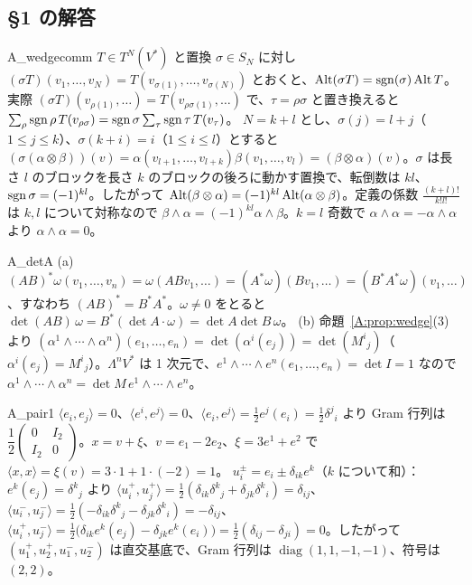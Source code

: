 
\subsection*{§1 の解答}


\begin{soll}{A_wedgecomm}
$T\in T^N(V^*)$ と置換 $\sigma\in S_N$ に対し $(\sigma T)(v_1,\dots,v_N)=T(v_{\sigma(1)},\dots,v_{\sigma(N)})$ とおくと、$\operatorname{Alt}(\sigma T)=\operatorname{sgn}(\sigma)\operatorname{Alt} T$。実際 $(\sigma T)(v_{\rho(1)},\dots)=T(v_{\rho\sigma(1)},\dots)$ で、$\tau=\rho\sigma$ と置き換えると $\sum_\rho\operatorname{sgn}\rho\,T(v_{\rho\sigma})=\operatorname{sgn}\sigma\sum_\tau\operatorname{sgn}\tau\,T(v_\tau)$。
$N=k+l$ とし、$\sigma(j)=l+j$（$1\le j\le k$）、$\sigma(k+i)=i$（$1\le i\le l$）とすると $(\sigma(\alpha\otimes\beta))(v)=\alpha(v_{l+1},\dots,v_{l+k})\beta(v_1,\dots,v_l)=(\beta\otimes\alpha)(v)$。$\sigma$ は長さ $l$ のブロックを長さ $k$ のブロックの後ろに動かす置換で、転倒数は $kl$、$\operatorname{sgn}\sigma=(-1)^{kl}$。したがって $\operatorname{Alt}(\beta\otimes\alpha)=(-1)^{kl}\operatorname{Alt}(\alpha\otimes\beta)$。定義の係数 $\frac{(k+l)!}{k!l!}$ は $k,l$ について対称なので $\beta\wedge\alpha=(-1)^{kl}\alpha\wedge\beta$。$k=l$ 奇数で $\alpha\wedge\alpha=-\alpha\wedge\alpha$ より $\alpha\wedge\alpha=0$。
\end{soll}

\begin{soll}{A_detA}
(a) $(AB)^*\omega(v_1,\dots,v_n)=\omega(ABv_1,\dots)=(A^*\omega)(Bv_1,\dots)=(B^*A^*\omega)(v_1,\dots)$、すなわち $(AB)^*=B^*A^*$。$\omega\neq0$ をとると $\det(AB)\,\omega=B^*(\det A\cdot\omega)=\det A\det B\,\omega$。
(b) 命題~\ref{A:prop:wedge}(3) より $(\alpha^1\wedge\cdots\wedge\alpha^n)(e_1,\dots,e_n)=\det(\alpha^i(e_j))=\det(M^i{}_j)$（$\alpha^i(e_j)=M^i{}_j$）。$\Lambda^nV^*$ は 1 次元で、$e^1\wedge\cdots\wedge e^n(e_1,\dots,e_n)=\det I=1$ なので $\alpha^1\wedge\cdots\wedge\alpha^n=\det M\,e^1\wedge\cdots\wedge e^n$。
\end{soll}

\begin{soll}{A_pair1}
$\langle e_i,e_j\rangle=0$、$\langle e^i,e^j\rangle=0$、$\langle e_i,e^j\rangle=\frac12e^j(e_i)=\frac12\delta^j{}_i$ より Gram 行列は $\dfrac12\begin{pmatrix}0&I_2\\I_2&0\end{pmatrix}$。$x=v+\xi$、$v=e_1-2e_2$、$\xi=3e^1+e^2$ で $\langle x,x\rangle=\xi(v)=3\cdot1+1\cdot(-2)=1$。
$u_i^\pm=e_i\pm\delta_{ik}e^k$（$k$ について和）：$e^k(e_j)=\delta^k{}_j$ より $\langle u_i^+,u_j^+\rangle=\frac12(\delta_{ik}\delta^k{}_j+\delta_{jk}\delta^k{}_i)=\delta_{ij}$、$\langle u_i^-,u_j^-\rangle=\frac12(-\delta_{ik}\delta^k{}_j-\delta_{jk}\delta^k{}_i)=-\delta_{ij}$、$\langle u_i^+,u_j^-\rangle=\frac12\bigl(\delta_{ik}e^k(e_j)-\delta_{jk}e^k(e_i)\bigr)=\frac12(\delta_{ij}-\delta_{ji})=0$。したがって $(u_1^+,u_2^+,u_1^-,u_2^-)$ は直交基底で、Gram 行列は $\operatorname{diag}(1,1,-1,-1)$、符号は $(2,2)$。
\end{soll}

